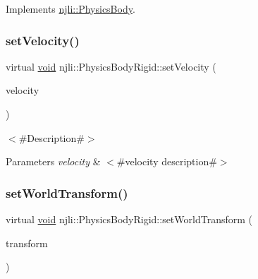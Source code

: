 Implements \mbox{\hyperlink{classnjli_1_1_physics_body_aa2859a8335e3c38ff71b12bc0b002b0e}{njli\+::\+Physics\+Body}}.

\mbox{\label{classnjli_1_1_physics_body_rigid_aabbcffe4b49667b4b0d285940c775ced}} 
\subsubsection{\texorpdfstring{set\+Velocity()}{setVelocity()}}
{\footnotesize\ttfamily virtual \mbox{\hyperlink{_thread_8h_af1e856da2e658414cb2456cb6f7ebc66}{void}} njli\+::\+Physics\+Body\+Rigid\+::set\+Velocity (\begin{DoxyParamCaption}\item[{const bt\+Vector3 \&}]{velocity }\end{DoxyParamCaption})\hspace{0.3cm}{\ttfamily [virtual]}}

$<$\#\+Description\#$>$


\begin{DoxyParams}{Parameters}
{\em velocity} & $<$\#velocity description\#$>$ \\
\hline
\end{DoxyParams}
\mbox{\label{classnjli_1_1_physics_body_rigid_a70afa1817272e87547d6fccd8ca91ff4}} 
\subsubsection{\texorpdfstring{set\+World\+Transform()}{setWorldTransform()}}
{\footnotesize\ttfamily virtual \mbox{\hyperlink{_thread_8h_af1e856da2e658414cb2456cb6f7ebc66}{void}} njli\+::\+Physics\+Body\+Rigid\+::set\+World\+Transform (\begin{DoxyParamCaption}\item[{const bt\+Transform \&}]{transform }\end{DoxyParamCaption})\hspace{0.3cm}{\ttfamily [virtual]}}

